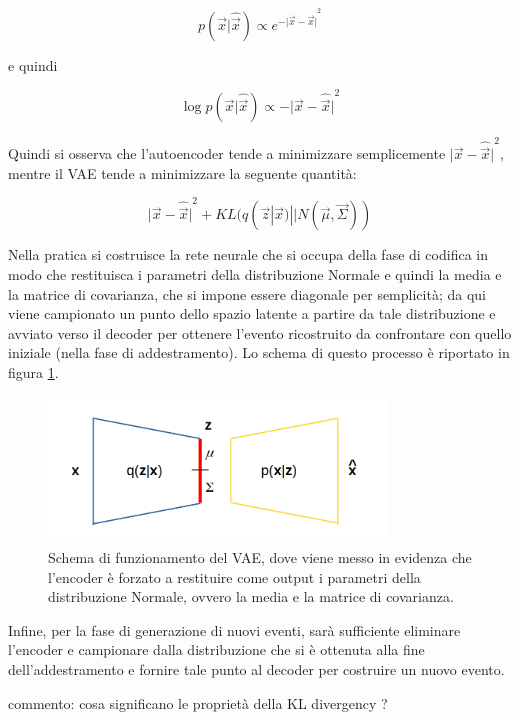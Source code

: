 \begin{equation}
	p(\vec{x}|\hat{\vec{x}}) \propto e^{{-{\lvert \vec{x}-\hat{\vec{x}}} \rvert}^2}
\end{equation}

e quindi

\begin{equation}
	\log p(\vec{x}|\hat{\vec{x}}) \propto -{\lvert \vec{x}-\hat{\vec{x}} \rvert}^2
\end{equation}

Quindi si osserva che l'autoencoder tende a minimizzare semplicemente ${\lvert \vec{x}-\hat{\vec{x}} \rvert}^2$, mentre il VAE tende a minimizzare la seguente quantità:

\begin{equation}
	{\lvert \vec{x}-\hat{\vec{x}} \rvert}^2 + KL (q(\vec{z}|\vec{x})||N(\vec{\mu},\vec{\Sigma}))
\end{equation}

Nella pratica si costruisce la rete neurale che si occupa della fase di codifica in modo che restituisca i parametri della distribuzione Normale e quindi la media e la matrice di covarianza, che si impone essere diagonale per semplicità; da qui viene campionato un punto dello spazio latente a partire da tale distribuzione e avviato verso il decoder per ottenere l'evento ricostruito da confrontare con quello iniziale (nella fase di addestramento). Lo schema di questo processo è riportato in figura \ref{schemaVAEs}.
\newpage

\begin{figure}[h!]
	\centering		\includegraphics[width=0.80\textwidth]{figs/VAEgauss.png}
	\caption{Schema di funzionamento del VAE, dove viene messo in evidenza che l'encoder è forzato a restituire come output i parametri della distribuzione Normale, ovvero la media e la matrice di covarianza.}
	\label{schemaVAEs}
\end{figure}


Infine, per la fase di generazione di nuovi eventi, sarà sufficiente eliminare l'encoder e campionare dalla distribuzione che si è ottenuta alla fine dell'addestramento e fornire tale punto al decoder per costruire un nuovo evento.

\color{red}
commento: cosa significano le proprietà della KL divergency ?
\color{black}

\newpage